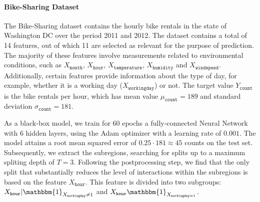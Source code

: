 \documentclass[runningheads]{llncs}
\newcommand{\when}[1]{\mathbbm{1}_{#1}}
\begin{document}
\paragraph{Bike-Sharing Dataset}

The Bike-Sharing dataset contains the hourly bike rentals in the state of Washington DC over the period 2011 and 2012.
The dataset contains a total of 14 features, out of which 11 are selected as relevant for the purpose of prediction.
The majority of these features involve measurements related to environmental conditions,
such as $X_{\mathtt{month}}$, $X_{\mathtt{hour}}$, $X_{\mathtt{temperature}}$, $X_{\mathtt{humidity}}$ and $X_{\mathtt{windspeed}}$.
Additionally, certain features provide information about the type of day, for example, whether it is a working day ($X_{\mathtt{workingday}}$) or not.
The target value \( Y_{\mathtt{count}}\) is the bike rentals per hour, which has mean value
\(\mu_{\mathtt{count}} = 189\) and standard deviation \(\sigma_{\mathtt{count}} = 181\).

As a black-box model, we train for \(60\) epochs a fully-connected Neural Network with 6 hidden layers, using the Adam optimizer with a learning rate of $0.001$.
The model attains a root mean squared error of \( 0.25 \cdot 181 \approx 45\) counts on the test set.
Subsequently, we extract the subregions, searching for splits up to a maximum spliting depth of \(T=3\).
Following the postprocessing step, we find that the only split that substantially reduces the level of interactions within the subregions is based on the feature
$X_{\mathtt{hour}}$. This feature is divided into two subgroups: $X_{\mathtt{hour}} | \when{X_{\mathtt{workingday}} \neq 1}$ and $X_{\mathtt{hour}} \when{X_{\mathtt{workingday} = 1}}$.
\end{document}
